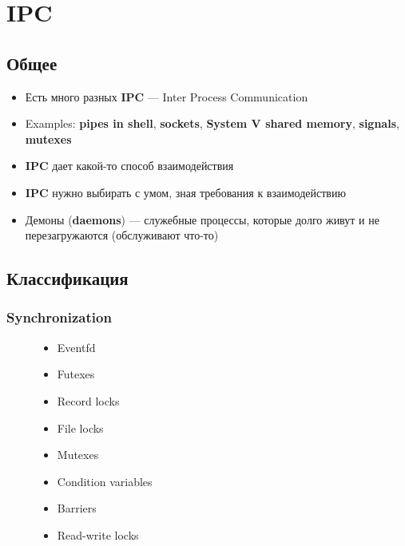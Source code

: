 \documentclass[../../lectures.tex]{subfiles}
\begin{document}
\chapter{IPC}

\section{Общее}
\begin{itemize}
    \item Есть много разных \textbf{IPC} --- Inter Process Communication
    \item Examples: \textbf{pipes in shell}, \textbf{sockets}, \textbf{System V shared memory},
          \textbf{signals}, \textbf{mutexes}
    \item \textbf{IPC} дает какой-то способ взаимодействия
    \item \textbf{IPC} нужно выбирать с умом, зная требования к взаимодействию
    \item Демоны (\textbf{daemons}) --- служебные процессы, которые долго живут 
          и не перезагружаются (обслуживают что-то)
\end{itemize}

\section{Классификация}
\subsection{Synchronization}
\begin{figure}[H]
\begin{minipage}[c]{0.4\linewidth}
\begin{itemize}
    \item Eventfd
    \item Futexes
    \item Record locks
    \item File locks
    \item Mutexes
    \item Condition variables
    \item Barriers
    \item Read-write locks
\end{itemize}
\end{minipage}
\begin{minipage}[c]{0.6\linewidth}
\end{minipage}
\end{figure}
\end{document}
